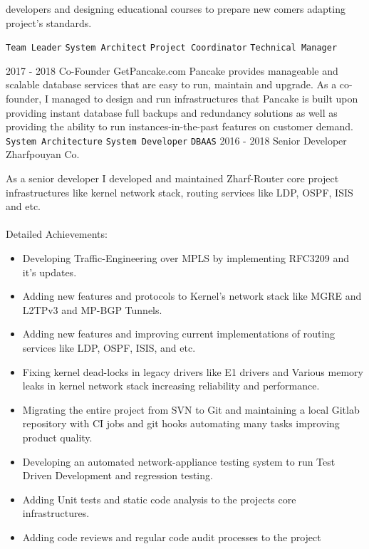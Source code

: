 \documentclass[12pt]{developercv}
\begin{document}
\begin{entrylist}
{\begin{itemize}
			      developers and designing educational courses to prepare
			      new comers adapting project's standards.
		\end{itemize}
		\texttt{Team Leader}\slashsep
		\texttt{System Architect}\slashsep
		\texttt{Project Coordinator}\slashsep
		\texttt{Technical Manager}
		}
	\entry
		{2017 - 2018}
		{Co-Founder}
		{GetPancake.com}
		{
		Pancake provides manageable and scalable database services that
		are easy to run, maintain and upgrade. As a co-founder, I managed
		to design and run infrastructures that Pancake is built upon providing
		instant database full backups and redundancy solutions as well as
		providing the ability to run instances-in-the-past features on customer
		demand.
		\\
		\texttt{System Architecture}\slashsep
		\texttt{System Developer}\slashsep
		\texttt{DBAAS}\slashsep
		}
	\entry
		{2016 - 2018}
		{Senior Developer}
		{Zharfpouyan Co.}
		{
		As a senior developer I developed and maintained Zharf-Router core project
		infrastructures like kernel network stack, routing services like LDP,
		OSPF, ISIS and etc.
		\\
		\\
		Detailed Achievements:
		\begin{itemize}
			\item Developing Traffic-Engineering over MPLS by implementing RFC3209
				  and it's updates.
			\item Adding new features and protocols to Kernel's network stack like
				  MGRE and L2TPv3 and MP-BGP Tunnels.
			\item Adding new features and improving current implementations of
				  routing services like LDP, OSPF, ISIS, and etc.
			\item Fixing kernel dead-locks in legacy drivers like E1 drivers and
				  Various memory leaks in kernel network stack increasing reliability
				  and performance.
			\item Migrating the entire project from SVN to Git and maintaining a
				  local Gitlab repository with CI jobs and git hooks automating
				  many tasks improving product quality.
			\item Developing an automated network-appliance testing system to run
				  Test Driven Development and regression testing.
			\item Adding Unit tests and static code analysis to the projects core
				  infrastructures.
			\item Adding code reviews and regular code audit processes to the project

\end{itemize}}
\end{entrylist}
\end{document}
